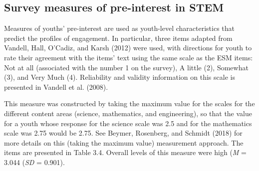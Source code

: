 \documentclass[]{book}
\theoremstyle{definition}
\theoremstyle{definition}
\theoremstyle{definition}
\theoremstyle{remark}
\begin{document}
\begin{landscape}\begin{table}

\caption{\label{tab:unnamed-chunk-5}Coding Frame for the Aspects of Work with Data}
\centering
{}
\end{table}
\end{landscape}

\subsection{Survey measures of pre-interest in
STEM}\label{survey-measures-of-pre-interest-in-stem}

Measures of youths' pre-interest are used as youth-level characteristics
that predict the profiles of engagement. In particular, three items
adapted from Vandell, Hall, O'Cadiz, and Karsh (2012) were used, with
directions for youth to rate their agreement with the items' text using
the same scale as the ESM items: Not at all (associated with the number
1 on the survey), A little (2), Somewhat (3), and Very Much (4).
Reliability and validity information on this scale is presented in
Vandell et al. (2008).

This measure was constructed by taking the maximum value for the scales
for the different content areas (science, mathematics, and engineering),
so that the value for a youth whose response for the science scale was
2.5 and for the mathematics scale was 2.75 would be 2.75. See Beymer,
Rosenberg, and Schmidt (2018) for more details on this (taking the
maximum value) measurement approach. The items are presented in Table
3.4. Overall levels of this measure were high (\emph{M} = 3.044
(\emph{SD} = 0.901).
\end{document}
